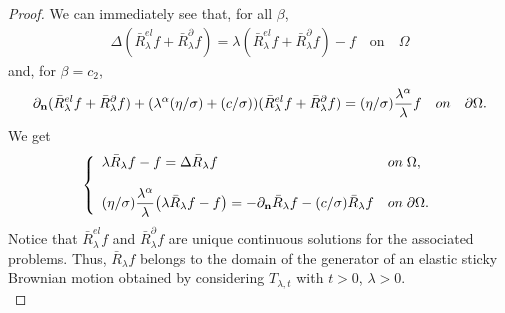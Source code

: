 \documentclass[11pt,a4paper]{article}
\begin{document}
\begin{proof}
We can immediately see that, for all $\beta$,
\begin{align*}
\Delta (\bar{R}^{el}_\lambda f + \bar{R}^{\partial}_\lambda f) = \lambda (\bar{R}^{el}_\lambda f + \bar{R}^{\partial}_\lambda f) - f \quad \textrm{on} \quad \Omega
\end{align*}
and, for $\beta=c_2$,
\begin{align*}
\partial_{\bf n} (\bar{R}^{el}_\lambda f + \bar{R}^{\partial}_\lambda f) + (\lambda^\alpha (\eta/\sigma) + (c/\sigma)) (\bar{R}^{el}_\lambda f + \bar{R}^{\partial}_\lambda f) = (\eta/\sigma) \frac{\lambda^\alpha}{\lambda} f \quad \textrm{on} \quad \partial \Omega.
\end{align*}
We get
\begin{equation*}
\left\lbrace
\begin{array}{ll}
\displaystyle \lambda \bar{R}_\lambda f - f = \Delta \bar{R}_\lambda f & \textrm{on}\; \Omega,\\ 
\\
\displaystyle  (\eta/\sigma) \frac{\lambda^\alpha}{\lambda} \big( \lambda \bar{R}_\lambda f - f\big) = - \partial_{\bf n} \bar{R}_\lambda f - (c/\sigma) \bar{R}_\lambda f & \textrm{on}\; \partial \Omega.
\end{array}
\right .
\end{equation*}
Notice that $\bar{R}_\lambda^{el}f$ and $\bar{R}_\lambda^{\partial} f$ are unique continuous solutions for the associated problems. Thus, $\bar{R}_\lambda f$ belongs to the domain of the generator of an elastic sticky Brownian motion obtained by considering $T_{\lambda, t}$ with $t>0$, $\lambda>0$. \\



\end{proof}
\end{document}
